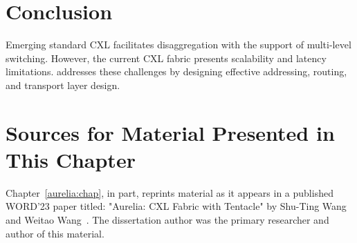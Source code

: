 
%


\section{Conclusion}
\label{aurelia:sec:conclusion}
%
Emerging standard CXL facilitates disaggregation with the support of multi-level switching. 
%
However, the current CXL fabric presents scalability and latency limitations. \aurelia addresses these challenges by designing effective addressing, routing, and transport layer design.

\section{Sources for Material Presented in This Chapter}
Chapter~\ref{aurelia:chap}, in part, reprints material as it appears in a published WORD'23 paper titled: 
"Aurelia: CXL Fabric with Tentacle" by Shu-Ting Wang and Weitao Wang~\cite{aurelia:words:2023}.
%
The dissertation author was the primary researcher and author of this material.